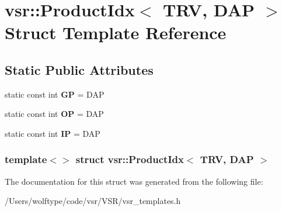 \hypertarget{structvsr_1_1_product_idx_3_01_t_r_v_00_01_d_a_p_01_4}{\section{vsr\-:\-:Product\-Idx$<$ T\-R\-V, D\-A\-P $>$ Struct Template Reference}
\label{structvsr_1_1_product_idx_3_01_t_r_v_00_01_d_a_p_01_4}
}
\subsection*{Static Public Attributes}
\begin{DoxyCompactItemize}
\item 
\hypertarget{structvsr_1_1_product_idx_3_01_t_r_v_00_01_d_a_p_01_4_a6a9d891d38a9afb8003e51741738fc9d}{static const int {\bfseries G\-P} = D\-A\-P}\label{structvsr_1_1_product_idx_3_01_t_r_v_00_01_d_a_p_01_4_a6a9d891d38a9afb8003e51741738fc9d}

\item 
\hypertarget{structvsr_1_1_product_idx_3_01_t_r_v_00_01_d_a_p_01_4_a9365fb1961a92a43dc63012de5a8e206}{static const int {\bfseries O\-P} = D\-A\-P}\label{structvsr_1_1_product_idx_3_01_t_r_v_00_01_d_a_p_01_4_a9365fb1961a92a43dc63012de5a8e206}

\item 
\hypertarget{structvsr_1_1_product_idx_3_01_t_r_v_00_01_d_a_p_01_4_a303eb9383fb3ad12cc59d2ae32f82319}{static const int {\bfseries I\-P} = D\-A\-P}\label{structvsr_1_1_product_idx_3_01_t_r_v_00_01_d_a_p_01_4_a303eb9383fb3ad12cc59d2ae32f82319}

\end{DoxyCompactItemize}
\subsubsection*{template$<$$>$ struct vsr\-::\-Product\-Idx$<$ T\-R\-V, D\-A\-P $>$}



The documentation for this struct was generated from the following file\-:\begin{DoxyCompactItemize}
\item 
/\-Users/wolftype/code/vsr/\-V\-S\-R/vsr\-\_\-templates.\-h\end{DoxyCompactItemize}
